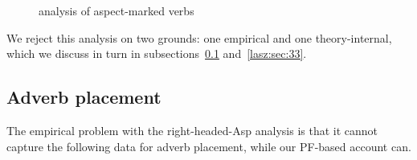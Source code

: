 \documentclass[output=paper]{langscibook}
\begin{document}
\begin{figure}
    \caption{ analysis of aspect-marked verbs}
    \label{lasz:fig:2}
\end{figure}

We reject this analysis on two grounds: one empirical and one
theory-internal, which we discuss in turn in subsections~\ref{lasz:sec:32} and~\ref{lasz:sec:33}.


\subsection{Adverb placement}
\label{lasz:sec:32}

The empirical problem with the right-headed-Asp analysis is that it
cannot capture the following data for adverb placement, while our PF-based account can.
\end{document}
